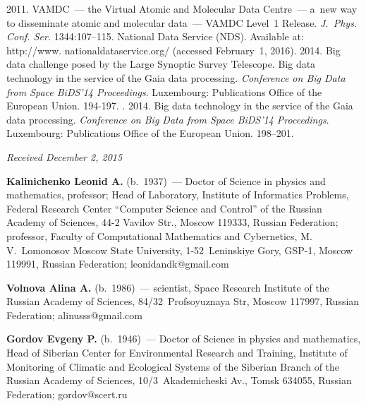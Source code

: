 \begin{multicols}{2}
{{\begin{thebibliography}{99}
 2011. VAMDC~--- the Virtual Atomic and 
Molecular Data Centre~--- a~new way to disseminate atomic and molecular data~--- VAMDC Level~1 Release. 
\textit{J.~Phys. Conf. Ser.} 1344:107--115.
National Data Service (NDS). Available at: {\sf http://www. nationaldataservice.org/} (accessed February~1, 2016).
 2014. Big data challenge posed by the Large Synoptic Survey Telescope. Big data technology in 
the service of the Gaia data processing. \textit{Conference on Big Data from Space BiDS'14 Proceedings}. Luxembourg: Publications Office of the 
European Union. 194-197.
. 2014. Big data technology in the service of the Gaia data processing. 
\textit{Conference on Big Data from Space BiDS'14 Proceedings}. 
Luxembourg: Publications Office of the 
European Union. 198--201.
\end{thebibliography}

 }
 }

\end{multicols}

\vspace*{-3pt}

\hfill{\small\textit{Received December 2, 2015}}


\Contr

\noindent
\textbf{Kalinichenko Leonid A.} (b.\ 1937)~--- Doctor of Science in physics and mathematics, 
professor; Head of Laboratory, Institute of Informatics Problems, 
Federal Research Center ``Computer Science and Control'' 
of the Russian Academy of Sciences, 44-2 Vavilov Str., Moscow 119333, Russian Federation; 
professor, Faculty of Computational Mathematics and Cybernetics, M.\,V.~Lomonosov Moscow 
State University, 1-52~Leninskiye Gory, GSP-1, Moscow 119991, Russian Federation; 
leonidandk@gmail.com 

\vspace*{3pt}

\noindent
\textbf{Volnova Alina A.} (b.\ 1986)~--- scientist, Space Research Institute of the Russian 
Academy of Sciences, 84/32~Profsoyuznaya Str, Moscow 117997, Russian Federation; 
alinusss@gmail.com
       
\vspace*{3pt}

\noindent
       \textbf{Gordov Evgeny P.} (b.\ 1946)~--- Doctor of Science in physics and 
mathematics, Head of Siberian Center for Environmental Research and Training, Institute of 
Monitoring of Climatic and Ecological Systems of the Siberian Branch 
of the Russian Academy 
of Sciences, 10/3~Akademicheski Av., 
Tomsk 634055, Russian Federation; gordov@scert.ru
       
